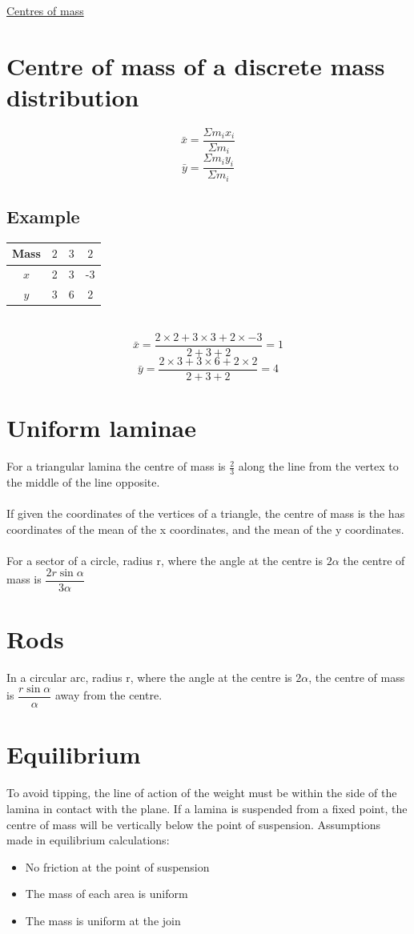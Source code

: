 \documentclass{article}[18pt]
\begin{document}
\begin{center}
\underline{\huge Centres of mass}
\end{center}
\section{Centre of mass of a discrete mass distribution}
$$\bar{x}=\dfrac{\Sigma m_ix_i}{\Sigma m_i}$$
$$\bar{y}=\dfrac{\Sigma m_iy_i}{\Sigma m_i}$$
\subsection{Example}
\begin{tabular}{|c|c|c|c|}
 \hline
 Mass&$2$&$3$&$2$\\
 \hline
 $x$&2&3&-3\\
 \hline
 $y$&3&6&2\\
 \hline

\end{tabular}
\\
$$\bar{x}=\dfrac{2\times 2+3\times3+2\times-3}{2+3+2}=1$$
$$\bar{y}=\dfrac{2\times3+3\times6+2\times2}{2+3+2}=4$$
\section{Uniform laminae}
For a triangular lamina the centre of mass is $\frac{2}{3}$ along the line from the vertex to the middle of the line opposite.\\
\\
If given the coordinates of the vertices of a triangle, the centre of mass is the has coordinates of the mean of the x coordinates, and the mean of the y coordinates.\\
\\
For a sector of a circle, radius r, where the angle at the centre is $2\alpha$ the centre of mass is $\dfrac{2r\sin\alpha}{3\alpha}$
\section{Rods}
In a circular arc, radius r, where the angle at the centre is $2\alpha$, the centre of mass is $\dfrac{r\sin\alpha}{\alpha}$ away from the centre.
\section{Equilibrium}
To avoid tipping, the line of action of the weight must be within the side of the lamina in contact with the plane.
If a lamina is suspended from a fixed point, the centre of mass will be vertically below the point of suspension.
Assumptions made in equilibrium calculations:
\begin{itemize}
\item No friction at the point of suspension
\item The mass of each area is uniform
\item The mass is uniform at the join
\end{itemize}
\end{document}
